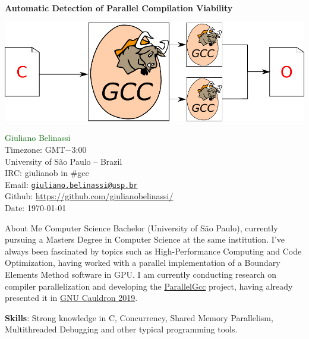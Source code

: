 \documentclass[12pt]{article}
\begin{document}
\newtheorem{theorem}{Teorema}%
\newtheorem{corollary}{Corolário}[theorem]
\newtheorem{lemma}[theorem]{Lema}

\begin{center}
\Huge \bf
Automatic Detection of Parallel Compilation Viability
\vspace{0.5cm}
\end{center}
\vspace*{\fill}
{
     \centering
     \includegraphics[scale=1.0]{logo.pdf}
    \par
}
\vspace*{\fill}
\normalsize{
\noindent\textcolor{darkgreen}{Giuliano Belinassi} \\
Timezone: GMT$-$3:00 \\
University of São Paulo -- Brazil \\
IRC: giulianob in \#gcc \\
Email: \href{mailto:giuliano.belinassi@usp.br}{\texttt{giuliano.belinassi@usp.br}} \\
Github: \url{https://github.com/giulianobelinassi/} \\
Date: \today
}
\newpage

\begin{section}{About Me}
    Computer Science Bachelor (University of São Paulo),
    currently pursuing a Masters Degree in Computer Science at the same
    institution. I've always been fascinated by topics such as
    High-Performance Computing and Code Optimization, having worked with
    a parallel implementation of a Boundary Elements Method software in GPU.
    I am currently conducting research on compiler parallelization and
    developing the \href{https://gcc.gnu.org/wiki/ParallelGcc}{ParallelGcc} project,
    having already presented it in \href{https://www.youtube.com/watch?v=jd6R3IK\_\_1Q}{GNU Cauldron 2019}.

    \textbf{Skills}: Strong knowledge in C, Concurrency, Shared Memory
    Parallelism, Multithreaded Debugging and other typical programming tools.
\end{section}
\end{document}
